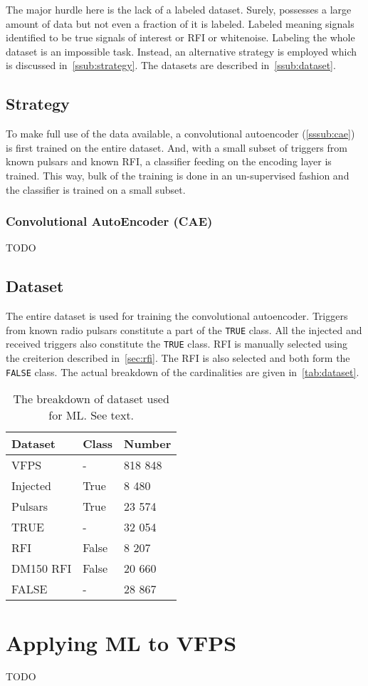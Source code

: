 \par The major hurdle here is the lack of a labeled dataset. 
Surely, \vfpfs possesses a large amount of data but not even a fraction of it is labeled.
Labeled meaning signals identified to be true signals of interest or RFI or whitenoise.
Labeling the whole dataset is an impossible task.
Instead, an alternative strategy is employed which is discussed in~\autoref{ssub:strategy}.
The datasets are described in~\autoref{ssub:dataset}.

\subsection{Strategy}
\label{ssub:strategy}

\par To make full use of the data available, a convolutional autoencoder (\autoref{sssub:cae}) is first trained on the entire dataset.
And, with a small subset of triggers from known pulsars and known RFI, a classifier feeding on the encoding layer is trained.
This way, bulk of the training is done in an un-supervised fashion and the classifier is trained on a small subset.

\subsubsection{Convolutional AutoEncoder (CAE)}
\label{sssub:cae}
\par TODO

\subsection{Dataset}
\label{ssub:dataset}

\par The entire \vfps dataset is used for training the convolutional autoencoder. 
Triggers from known radio pulsars constitute a part of the \texttt{TRUE} class.
All the injected and received triggers also constitute the \texttt{TRUE} class.
RFI is manually selected using the creiterion described in~\autoref{sec:rfi}.
The  RFI is also selected and both form the \texttt{FALSE} class.
The actual breakdown of the cardinalities are given in~\autoref{tab:dataset}.

\begin{table}[]
\label{tab:dataset}
	\begin{tabular}{@{}lll@{}}
		\toprule
		Dataset & Class & Number \\ \midrule
		VFPS & - & 818 848 \\ \midrule
		Injected & True & 8 480 \\
		Pulsars & True & 23 574 \\
		TRUE & - & 32 054 \\ \midrule
		RFI & False & 8 207 \\
		DM150 RFI & False & 20 660 \\
		FALSE & - & 28 867 \\ \bottomrule
	\end{tabular}
	\caption{The breakdown of \vfps dataset used for ML. See text.}
\end{table}

\section {Applying ML to VFPS}
\label{sec:ml_vfps}

\par TODO
